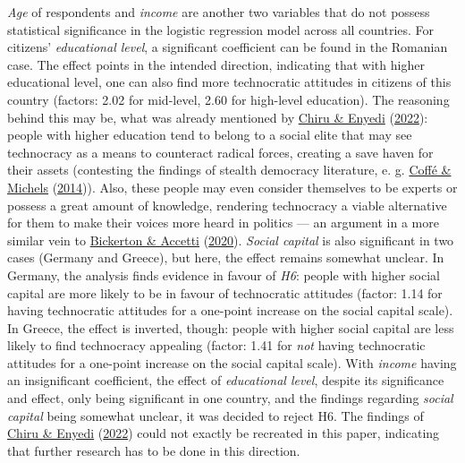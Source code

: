 \documentclass[
  12pt,
  english,
]{article}
\begin{document}
\emph{Age} of respondents and \emph{income} are another two variables
that do not possess statistical significance in the logistic regression
model across all countries. For citizens' \emph{educational level}, a
significant coefficient can be found in the Romanian case. The effect
points in the intended direction, indicating that with higher
educational level, one can also find more technocratic attitudes in
citizens of this country (factors: 2.02 for mid-level, 2.60 for
high-level education). The reasoning behind this may be, what was
already mentioned by \protect\hyperlink{ref-chiru2022wants}{Chiru \&
Enyedi} (\protect\hyperlink{ref-chiru2022wants}{2022}): people with
higher education tend to belong to a social elite that may see
technocracy as a means to counteract radical forces, creating a save
haven for their assets (contesting the findings of stealth democracy
literature, e. g. \protect\hyperlink{ref-coffe2014education}{Coffé \&
Michels} (\protect\hyperlink{ref-coffe2014education}{2014})). Also,
these people may even consider themselves to be experts or possess a
great amount of knowledge, rendering technocracy a viable alternative
for them to make their voices more heard in politics --- an argument in
a more similar vein to
\protect\hyperlink{ref-bickerton2020technocracy}{Bickerton \& Accetti}
(\protect\hyperlink{ref-bickerton2020technocracy}{2020}). \emph{Social
capital} is also significant in two cases (Germany and Greece), but
here, the effect remains somewhat unclear. In Germany, the analysis
finds evidence in favour of \emph{H6}: people with higher social capital
are more likely to be in favour of technocratic attitudes (factor: 1.14
for having technocratic attitudes for a one-point increase on the social
capital scale). In Greece, the effect is inverted, though: people with
higher social capital are less likely to find technocracy appealing
(factor: 1.41 for \emph{not} having technocratic attitudes for a
one-point increase on the social capital scale). With \emph{income}
having an insignificant coefficient, the effect of \emph{educational
level}, despite its significance and effect, only being significant in
one country, and the findings regarding \emph{social capital} being
somewhat unclear, it was decided to reject H6. The findings of
\protect\hyperlink{ref-chiru2022wants}{Chiru \& Enyedi}
(\protect\hyperlink{ref-chiru2022wants}{2022}) could not exactly be
recreated in this paper, indicating that further research has to be done
in this direction.
\end{document}
